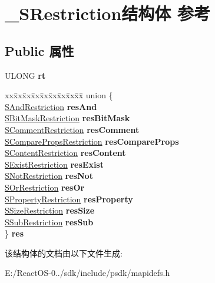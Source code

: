 \hypertarget{struct___s_restriction}{}\section{\+\_\+\+S\+Restriction结构体 参考}
\label{struct___s_restriction}
\subsection*{Public 属性}
\begin{DoxyCompactItemize}
\item 
\mbox{\label{struct___s_restriction_aed0dd15ca1906cf4051b17ac235ad31c}} 
U\+L\+O\+NG {\bfseries rt}
\item 
\mbox{\label{struct___s_restriction_a3ac0c8edeb459bc7f10cc292c7394815}} 
\begin{tabbing}
xx\=xx\=xx\=xx\=xx\=xx\=xx\=xx\=xx\=\kill
union \{\\
\>\hyperlink{struct___s_and_restriction}{SAndRestriction} {\bfseries resAnd}\\
\>\hyperlink{struct___s_bit_mask_restriction}{SBitMaskRestriction} {\bfseries resBitMask}\\
\>\hyperlink{struct___s_comment_restriction}{SCommentRestriction} {\bfseries resComment}\\
\>\hyperlink{struct___s_compare_props_restriction}{SComparePropsRestriction} {\bfseries resCompareProps}\\
\>\hyperlink{struct___s_content_restriction}{SContentRestriction} {\bfseries resContent}\\
\>\hyperlink{struct___s_exist_restriction}{SExistRestriction} {\bfseries resExist}\\
\>\hyperlink{struct___s_not_restriction}{SNotRestriction} {\bfseries resNot}\\
\>\hyperlink{struct___s_or_restriction}{SOrRestriction} {\bfseries resOr}\\
\>\hyperlink{struct___s_property_restriction}{SPropertyRestriction} {\bfseries resProperty}\\
\>\hyperlink{struct___s_size_restriction}{SSizeRestriction} {\bfseries resSize}\\
\>\hyperlink{struct___s_sub_restriction}{SSubRestriction} {\bfseries resSub}\\
\} {\bfseries res}\\

\end{tabbing}\end{DoxyCompactItemize}


该结构体的文档由以下文件生成\+:\begin{DoxyCompactItemize}
\item 
E\+:/\+React\+O\+S-\/0../sdk/include/psdk/mapidefs.\+h\end{DoxyCompactItemize}
